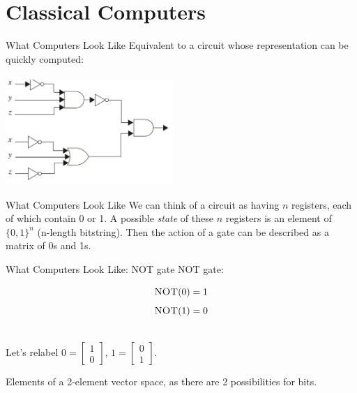 \documentclass{beamer}
\begin{document}
\section{Classical Computers}
\begin{frame}{What Computers Look Like}
Equivalent to a circuit whose representation can be quickly computed: \\
\ \\

\centering \includegraphics[height=4cm]{bool-circuit.png}
\end{frame}
\begin{frame}{What Computers Look Like}
We can think of a circuit as having $n$ registers, each of which contain 0 or 1.
A possible \textit{state} of these $n$ registers is an element of $\{ 0, 1 \}^n$ (n-length bitstring).
Then the action of a gate can be described as a matrix of 0s and 1s.
\end{frame}
\begin{frame}{What Computers Look Like: NOT gate}
    \textsc{NOT} gate:
    
    $$ \textsc{NOT}(0) = 1$$
    $$ \textsc{NOT}(1) = 0$$
    
    \ \\
    
    \pause Let's relabel $0 = \begin{bmatrix}
        1 \\
        0
    \end{bmatrix}$, $1 = \begin{bmatrix}
        0 \\
        1
    \end{bmatrix}$.
    
    Elements of a 2-element vector space, as there are 2 possibilities for bits.
\end{frame}
\end{document}
